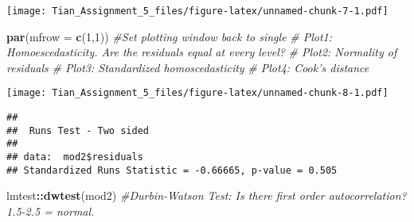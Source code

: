 \documentclass[]{article}
\newenvironment{Shaded}{\begin{snugshade}}{\end{snugshade}}
\newcommand{\CommentTok}[1]{\textcolor[rgb]{0.56,0.35,0.01}{\textit{#1}}}
\newcommand{\DataTypeTok}[1]{\textcolor[rgb]{0.13,0.29,0.53}{#1}}
\newcommand{\DecValTok}[1]{\textcolor[rgb]{0.00,0.00,0.81}{#1}}
\newcommand{\KeywordTok}[1]{\textcolor[rgb]{0.13,0.29,0.53}{\textbf{#1}}}
\newcommand{\NormalTok}[1]{#1}
\newcommand{\OperatorTok}[1]{\textcolor[rgb]{0.81,0.36,0.00}{\textbf{#1}}}
\begin{document}
\texttt{[image: Tian\_Assignment\_5\_files/figure-latex/unnamed-chunk-7-1.pdf]}

\begin{Shaded}
\begin{Highlighting}[]
\KeywordTok{par}\NormalTok{(}\DataTypeTok{mfrow =} \KeywordTok{c}\NormalTok{(}\DecValTok{1}\NormalTok{,}\DecValTok{1}\NormalTok{))  }\CommentTok{#Set plotting window back to single}
\CommentTok{# Plot1: Homoescedasticity. Are the residuals equal at every level?}
\CommentTok{# Plot2: Normality of residuals}
\CommentTok{# Plot3: Standardized homoscedasticity}
\CommentTok{# Plot4: Cook's distance}
\end{Highlighting}
\end{Shaded}

\begin{Shaded}
\end{Shaded}

\texttt{[image: Tian\_Assignment\_5\_files/figure-latex/unnamed-chunk-8-1.pdf]}

\begin{Shaded}
\end{Shaded}

\begin{verbatim}
## 
##  Runs Test - Two sided
## 
## data:  mod2$residuals
## Standardized Runs Statistic = -0.66665, p-value = 0.505
\end{verbatim}

\begin{Shaded}
\begin{Highlighting}[]
\NormalTok{lmtest}\OperatorTok{::}\KeywordTok{dwtest}\NormalTok{(mod2)               }\CommentTok{#Durbin-Watson Test: Is there first order autocorrelation? 1.5-2.5 = normal.}
\end{Highlighting}
\end{Shaded}
\end{document}
